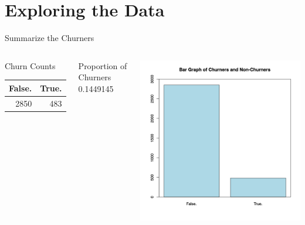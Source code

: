 \documentclass[handout]{beamer}
\begin{document}
\section{Exploring the Data}
\begin{frame}{Summarize the Churners}
\begin{columns}
    \begin{block}{Churn Counts}
    \begin{tabular}{rr}
    {\bf False.} & {\bf True.}\\
    \hline
    2850 & 483\\
    \end{tabular}
    \end{block}
    \begin{block}{Proportion of Churners}
    0.1449145
    \end{block}              
    \includegraphics[width=\textwidth]{images/bargraph-churners}
\end{columns}
\end{frame}
\end{document}
